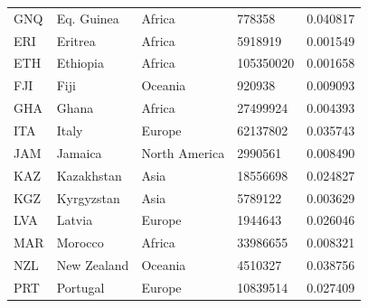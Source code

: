 \documentclass[11pt]{report}
\begin{document}
\begin{table}[h!]
\begin{tabular}{lllll}
            GNQ                           & Eq. Guinea                & Africa                         & 778358                        & 0.040817                           \\
            ERI                           & Eritrea                   & Africa                         & 5918919                       & 0.001549                           \\
            ETH                           & Ethiopia                  & Africa                         & 105350020                     & 0.001658                           \\
            FJI                           & Fiji                      & Oceania                        & 920938                        & 0.009093                           \\
            GHA                           & Ghana                     & Africa                         & 27499924                      & 0.004393                           \\
            ITA                           & Italy                     & Europe                         & 62137802                      & 0.035743                           \\
            JAM                           & Jamaica                   & North America                  & 2990561                       & 0.008490                           \\
            KAZ                           & Kazakhstan                & Asia                           & 18556698                      & 0.024827                           \\
            KGZ                           & Kyrgyzstan                & Asia                           & 5789122                       & 0.003629                           \\
            LVA                           & Latvia                    & Europe                         & 1944643                       & 0.026046                           \\
            MAR                           & Morocco                   & Africa                         & 33986655                      & 0.008321                           \\
            NZL                           & New Zealand               & Oceania                        & 4510327                       & 0.038756                           \\
            PRT                           & Portugal                  & Europe                         & 10839514                      & 0.027409                           \\

\end{tabular}
\end{table}
\end{document}
